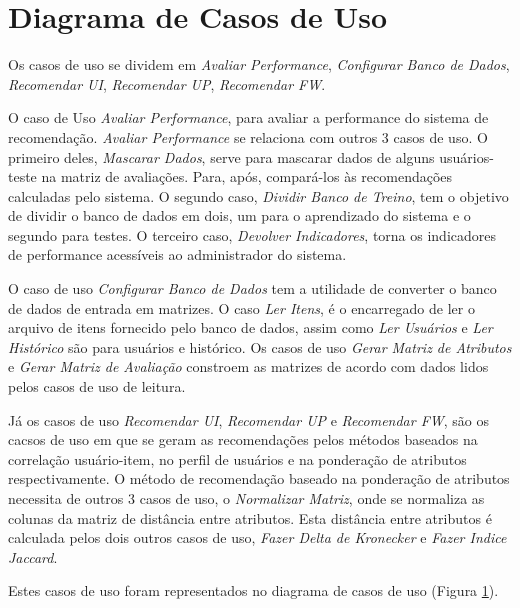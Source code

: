 \section{Diagrama de Casos de Uso} %
\label{sec:Diagrama de Casos de Uso}

Os casos de uso se dividem em \textit{Avaliar Performance}, \textit{Configurar Banco de Dados}, \textit{Recomendar UI}, \textit{Recomendar UP}, \textit{Recomendar FW}.

O caso de Uso \textit{Avaliar Performance}, para avaliar a performance do sistema de recomendação. \textit{Avaliar Performance} se relaciona com outros 3 casos de uso. O primeiro deles, \textit{Mascarar Dados}, serve para mascarar dados de alguns usuários-teste na matriz de avaliações. Para, após, compará-los às recomendações calculadas pelo sistema. O segundo caso, \textit{Dividir Banco de Treino}, tem o objetivo de dividir o banco de dados em dois, um para o aprendizado do sistema e o segundo para testes. O terceiro caso, \textit{Devolver Indicadores}, torna os indicadores de performance acessíveis ao administrador do sistema.

O caso de uso \textit{Configurar Banco de Dados} tem a utilidade de converter o banco de dados de entrada em matrizes. O caso \textit{Ler Itens}, é o encarregado de ler o arquivo de itens fornecido pelo banco de dados, assim como \textit{Ler Usuários} e \textit{Ler Histórico} são para usuários e histórico. Os casos de uso \textit{Gerar Matriz de Atributos} e \textit{Gerar Matriz de Avaliação} constroem as matrizes de acordo com dados lidos pelos casos de uso de leitura.

Já os casos de uso \textit{Recomendar UI}, \textit{Recomendar UP} e \textit{Recomendar FW}, são os cacsos de uso em que se geram as recomendações pelos métodos baseados na correlação usuário-item, no perfil de usuários e na ponderação de atributos respectivamente. O método de recomendação baseado na ponderação de atributos necessita de outros 3 casos de uso, o \textit{Normalizar Matriz}, onde se normaliza as colunas da matriz de distância entre atributos. Esta distância entre atributos é calculada pelos dois outros casos de uso, \textit{Fazer Delta de Kronecker} e \textit{Fazer Indice Jaccard}.

 Estes casos de uso foram representados no diagrama de casos de uso (Figura \ref{sec:Diagrama de Casos de Uso}).

